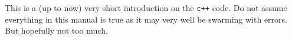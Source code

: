 This is a (up to now) very short introduction on the \texttt{c++} code. Do not assume everything in this manual is true as it may very well be swarming with errors. But hopefully not too much.